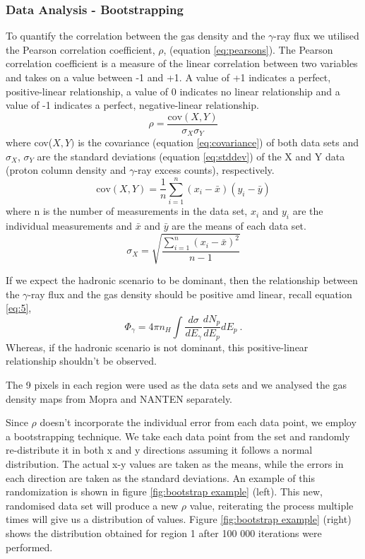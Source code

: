 \documentclass[12pt,a4paper]{article}
\begin{document}
\subsubsection{Data Analysis - Bootstrapping}
To quantify the correlation between the gas density and the $\gamma$-ray flux we utilised the Pearson correlation coefficient, $\rho$, (equation \ref{eq:pearsons}). The Pearson correlation coefficient is a measure of the linear correlation between two variables and takes on a value between -1 and +1. A value of +1 indicates a perfect, positive-linear relationship, a value of 0 indicates no linear relationship and a value of -1 indicates a perfect, negative-linear relationship. 
\begin{equation}\label{eq:pearsons}
\rho = \dfrac{\mathrm{cov}(X,Y)}{\sigma_X \sigma_Y}
\end{equation}
where cov($X,Y)$ is the covariance (equation \ref{eq:covariance}) of both data sets and $\sigma_X$, $\sigma_Y$ are the standard deviations (equation \ref{eq:stddev}) of the X and Y data (proton column density and $\gamma$-ray excess counts), respectively.
\begin{equation}\label{eq:covariance}
\mathrm{cov}(X,Y) = \dfrac{1}{n} \sum_{i=1}^n (x_i - \bar{x})(y_i - \bar{y})
\end{equation}
where n is the number of measurements in the data set, $x_i$ and $y_i$ are the individual measurements and $\bar{x}$ and $\bar{y}$ are the means of each data set.
\begin{equation}\label{eq:stddev}
\sigma_X = \sqrt{\dfrac{\sum_{i=1}^n (x_i - \bar{x})^2}{n -1}}
\end{equation}

If we expect the hadronic scenario to be dominant, then the relationship between the $\gamma$-ray flux and the gas density should be positive amd linear, recall equation \ref{eq:5},
\begin{equation} 
\Phi_{\gamma} = 4 \pi n_H \int \dfrac{d\sigma}{dE_\gamma} \dfrac{dN_p}{dE_p} dE_p \ .
\end{equation}
Whereas, if the hadronic scenario is not dominant, this positive-linear relationship shouldn't be observed. 

The 9 pixels in each region were used as the data sets and we analysed the gas density maps from Mopra and NANTEN separately. 

Since $\rho$ doesn't incorporate the individual error from each data point, we employ a bootstrapping technique. 
We take each data point from the set and randomly re-distribute it in both x and y directions assuming it follows a normal distribution. 
The actual x-y values are taken as the means, while the errors in each direction are taken as the standard deviations. 
An example of this randomization is shown in figure \ref{fig:bootstrap example} (left). 
This new, randomised data set will produce a new $\rho$ value, reiterating the process multiple times will give us a distribution of values. 
Figure \ref{fig:bootstrap example} (right) shows the distribution obtained for region 1 after 100 000 iterations were performed. 
\end{document}
